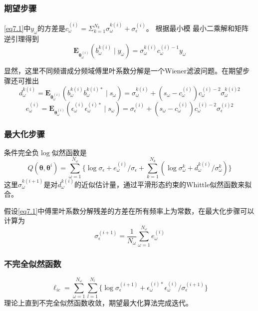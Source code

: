 \subsubsection{期望步骤}
\eqref{eq7.1}中$y_\omega$的方差是$c_\omega^{(i)}=\Sigma_{k=1}^{N_k}\sigma_\omega^{k(i)}+\sigma_\epsilon^{(i)}$。 根据最小模
最小二乘解和矩阵逆引理得到
\begin{equation}\label{eq7.5}
\mathbf{E}_{\mathbf{\theta}_\omega^{(i)}}(b_\omega^{k(i)}\mid{y}_\omega)=\sigma_\omega^{k(i)}c_\omega^{(i)-1}y_\omega
\end{equation}

显然，这里不同频谱成分频域傅里叶系数分解是一个Wiener滤波问题。在期望步骤还可推出
\begin{equation}\label{eq7.6}
d_\omega^{k(i)}=\mathbf{E}_{\mathbf{\theta}_\omega^{(i)}}(b_\omega^{k(i)}b_\omega^{k(i)*}\mid{s}_\omega)=\sigma_\omega^{k(i)}+(s_\omega-c_\omega^{(i)})c_\omega^{(i)-2}\sigma_\omega^{k(i)2}
\end{equation}
\begin{equation}\label{eq7.7}
e_\omega^{(i)}=\mathbf{E}_{\mathbf{\theta}_\omega^{(i)}}(\epsilon_\omega^{(i)}\epsilon_\omega^{(i)*}\mid{s}_\omega)=\sigma_\epsilon^{(i)}+(s_\omega-c_\omega^{(i)})c_\omega^{(i)-2}\sigma_\epsilon^{(i)2}
\end{equation}

\subsubsection{最大化步骤}
条件完全负$\log$似然函数是
\begin{equation}\label{eq7.8}
Q(\mathbf{\theta},\mathbf{\theta}^{i})=\sum_{\omega=1}^{N_\omega}\lbrace\log{\sigma_\epsilon}+e_\omega^{(i)}/\sigma_\epsilon+\sum_{k=1}^{N_k}(\log{\sigma}_\omega^k+d_\omega^{k(i)}/\sigma_\omega^k)\rbrace
\end{equation}
这里$\sigma_\omega^{k(i+1)}$是对$d_\omega^{k(i)}$的近似估计量，通过平滑形态约束的Whittle似然函数来拟合。

假设\eqref{eq7.1}中傅里叶系数分解残差的方差在所有频率上为常数，在最大化步骤可以计算为
\begin{equation}\label{eq7.9}
\sigma_\epsilon^{(i+1)}=\frac{1}{N_\omega}\sum_{\omega=1}^{N_\omega}e_\omega^{(i)}
\end{equation}

\subsubsection{不完全似然函数}
\begin{equation}\label{eq7.10}
\ell_{ic}=\sum_{\omega=1}^{N_\omega}\sum_{l=1}^{N_l}\lbrace\log{\sigma_\epsilon^{(i+1)}}+\epsilon_\omega^{(i)*}\epsilon_\omega^{(i)}/\sigma_\epsilon^{(i+1)}\rbrace
\end{equation}
理论上直到不完全似然函数收敛，期望最大化算法完成迭代。

